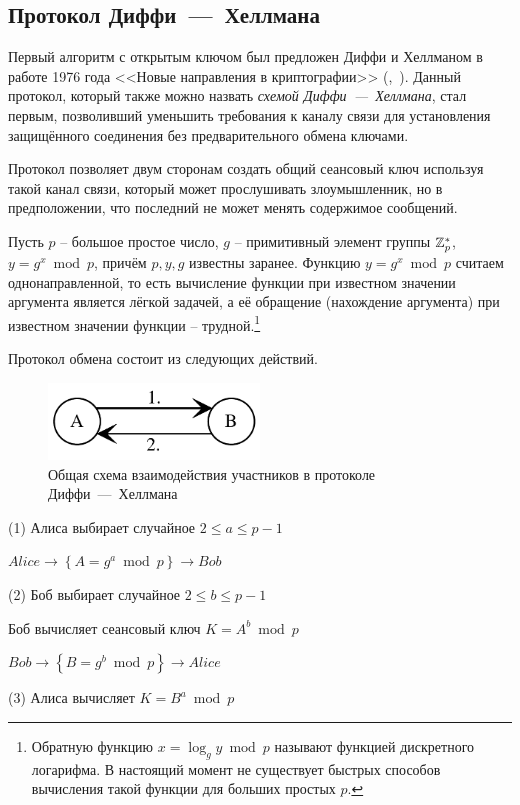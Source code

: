 \subsection{Протокол Диффи~---~Хеллмана}\label{section-protocols-diffie-hellman}

Первый алгоритм с открытым ключом был предложен Диффи и Хеллманом в работе 1976 года <<Новые направления в криптографии>> (,~\cite{Diffie:Hellman:1976}). Данный протокол, который также можно назвать \emph{схемой Диффи~---~Хеллмана}, стал первым, позволивший уменьшить требования к каналу связи для установления защищённого соединения без предварительного обмена ключами.

Протокол позволяет двум сторонам создать общий сеансовый ключ используя такой канал связи, который может прослушивать злоумышленник, но в предположении, что последний не может менять содержимое сообщений.

Пусть $p$ -- большое простое число, $g$ -- примитивный элемент группы $\mathbb{Z}_p^*$, ~ $y = g^x \bmod p$, причём $p, y, g$ известны заранее. Функцию $y=g^{x} \bmod p$ считаем однонаправленной, то есть вычисление функции при известном значении аргумента является лёгкой задачей, а её обращение (нахождение аргумента) при известном значении функции -- трудной.\footnote{Обратную функцию $x = \log_g y \bmod p$ называют функцией дискретного логарифма. В настоящий момент не существует быстрых способов вычисления такой функции для больших простых $p$.}

Протокол обмена состоит из следующих действий.

\begin{figure}
    \centering
    \includegraphics[width=0.5\textwidth]{pic/key_distribution-diffie-hellman}
    \caption{Общая схема взаимодействия участников в протоколе Диффи~---~Хеллмана\label{fig:key_distribution-diffie-hellman}}
\end{figure}

\begin{protocol}
    \item[(1)] Алиса выбирает случайное $2 \leq a \leq p - 1$
    \item[{}] $Alice \to \left\{ A = g ^ a \bmod p \right\} \to Bob$
    \item[(2)] Боб выбирает случайное $2 \leq b \leq p-1$
    \item[{}] Боб вычисляет сеансовый ключ $K = A ^ b \bmod p$
    \item[{}] $Bob \to \left\{ B = g ^ b \bmod p \right\} \to Alice$
    \item[(3)] Алиса вычисляет $K = B ^ a \bmod p$
\end{protocol}

